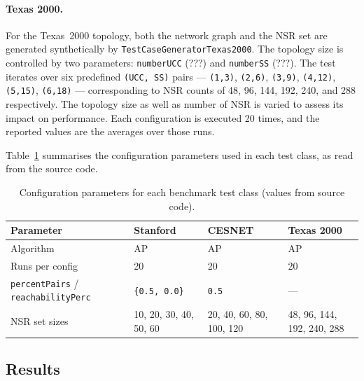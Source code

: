 \paragraph{Texas 2000.}
For the Texas~2000 topology, both the network graph and the NSR set are generated synthetically by \texttt{TestCaseGeneratorTexas2000}. The topology size is controlled by two parameters: \texttt{numberUCC} (???) and \texttt{numberSS} (???). The test iterates over six predefined \texttt{(UCC, SS)} pairs — \texttt{(1,3)}, \texttt{(2,6)}, \texttt{(3,9)}, \texttt{(4,12)}, \texttt{(5,15)}, \texttt{(6,18)} — corresponding to NSR counts of 48, 96, 144, 192, 240, and 288 respectively. The topology size as well as number of NSR is varied to assess its impact on performance. Each configuration is executed 20 times, and the reported values are the averages over those runs.


Table~\ref{tab:test-configs} summarises the configuration parameters used in each test class, as read from the source code.


\begin{table}[htbp]
\centering
\caption{Configuration parameters for each benchmark test class (values from source code).}
\label{tab:test-configs}
\begin{tabularx}{\textwidth}{lXXX}
\hline
\textbf{Parameter} & \textbf{Stanford} & \textbf{CESNET} & \textbf{Texas 2000} \\
\hline
Algorithm & AP & AP & AP \\
Runs per config & 20 & 20 & 20 \\
\texttt{percentPairs} / \texttt{reachabilityPerc} & \texttt{\{0.5, 0.0\}} & \texttt{0.5} & —\footnotemark \\
NSR set sizes & 10, 20, 30, 40, 50, 60 & 20, 40, 60, 80, 100, 120 & 48, 96, 144, 192, 240, 288 \\
\hline
\end{tabularx}
\end{table}

\subsection{Results}


